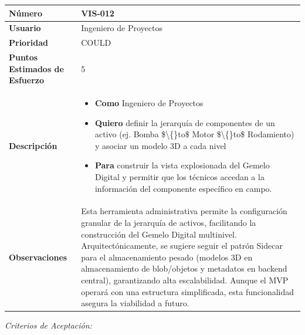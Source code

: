 \begin{longtable}{|p{0.21\textwidth}|p{0.74\textwidth}|}\hline
\textbf{Número} & VIS-012 \\ \hline
\textbf{Usuario} & Ingeniero de Proyectos \\ \hline
\textbf{Prioridad} & COULD \\ \hline
\textbf{Puntos Estimados de Esfuerzo} & 5 \\ \hline
\textbf{Descripción} & \parbox[t]{\linewidth}{\vspace{2pt}\begin{itemize}[leftmargin=1.5em, nosep, topsep=0pt]
\item \textbf{Como} Ingeniero de Proyectos
\item \textbf{Quiero} definir la jerarquía de componentes de un activo (ej. Bomba \$\textbackslash\{\}to\$ Motor \$\textbackslash\{\}to\$ Rodamiento) y asociar un modelo 3D a cada nivel
\item \textbf{Para} construir la vista explosionada del Gemelo Digital y permitir que los técnicos accedan a la información del componente específico en campo.
\end{itemize}\vspace{2pt}} \\ \hline
\textbf{Observaciones} & Esta herramienta administrativa permite la configuración granular de la jerarquía de activos, facilitando la construcción del Gemelo Digital multinivel. Arquitectónicamente, se sugiere seguir el patrón Sidecar para el almacenamiento pesado (modelos 3D en almacenamiento de blob/objetos y metadatos en backend central), garantizando alta escalabilidad. Aunque el MVP operará con una estructura simplificada, esta funcionalidad asegura la viabilidad a futuro. \\ \hline
\end{longtable}\normalsize
\noindent\textit{Criterios de Aceptación:}
